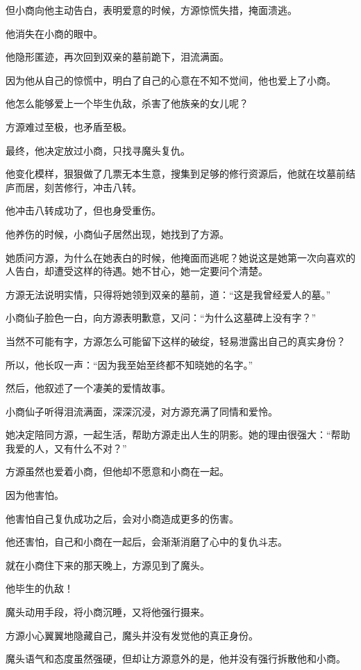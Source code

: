 \begin{this_body}
但小商向他主动告白，表明爱意的时候，方源惊慌失措，掩面溃逃。

他消失在小商的眼中。

他隐形匿迹，再次回到双亲的墓前跪下，泪流满面。

因为他从自己的惊慌中，明白了自己的心意在不知不觉间，他也爱上了小商。

他怎么能够爱上一个毕生仇敌，杀害了他族亲的女儿呢？

方源难过至极，也矛盾至极。

最终，他决定放过小商，只找寻魔头复仇。

他变化模样，狠狠做了几票无本生意，搜集到足够的修行资源后，他就在坟墓前结庐而居，刻苦修行，冲击八转。

他冲击八转成功了，但也身受重伤。

他养伤的时候，小商仙子居然出现，她找到了方源。

她质问方源，为什么在她表白的时候，他掩面而逃呢？她说这是她第一次向喜欢的人告白，却遭受这样的待遇。她不甘心，她一定要问个清楚。

方源无法说明实情，只得将她领到双亲的墓前，道：“这是我曾经爱人的墓。”

小商仙子脸色一白，向方源表明歉意，又问：“为什么这墓碑上没有字？”

当然不可能有字，方源怎么可能留下这样的破绽，轻易泄露出自己的真实身份？

所以，他长叹一声：“因为我至始至终都不知晓她的名字。”

然后，他叙述了一个凄美的爱情故事。

小商仙子听得泪流满面，深深沉浸，对方源充满了同情和爱怜。

她决定陪同方源，一起生活，帮助方源走出人生的阴影。她的理由很强大：“帮助我爱的人，又有什么不对？”

方源虽然也爱着小商，但他却不愿意和小商在一起。

因为他害怕。

他害怕自己复仇成功之后，会对小商造成更多的伤害。

他还害怕，自己和小商在一起后，会渐渐消磨了心中的复仇斗志。

就在小商住下来的那天晚上，方源见到了魔头。

他毕生的仇敌！

魔头动用手段，将小商沉睡，又将他强行摄来。

方源小心翼翼地隐藏自己，魔头并没有发觉他的真正身份。

魔头语气和态度虽然强硬，但却让方源意外的是，他并没有强行拆散他和小商。


\end{this_body}
